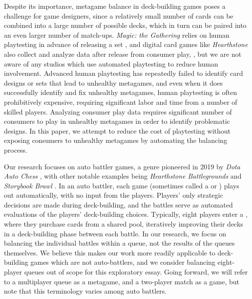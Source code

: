 
Despite its importance, metagame balance in deck-building games poses
a challenge for game designers, since a relatively small number of
cards can be combined into a large number of possible decks, which in
turn can be paired into an even larger number of
match-ups. \textit{Magic: the Gathering} relies on human playtesting
in advance of releasing a set \cite{designing-hod-ffl}, and digital
card games like \textit{Hearthstone} also collect and analyze data
after release from consumer play,
\cite{blizzard-gamebalancetalk-keg2019}, but we are not aware of any
studios which use automated playtesting to reduce human involvement.
Advanced human playtesting has repeatedly failed to identify card
designs or sets that lead to unhealthy metagames, and even when it
does successfully identify and fix unhealthy metagames, human
playtesting is often prohibitively expensive, requiring significant
labor and time from a number of skilled players. Analyzing consumer
play data requires significant number of consumers to play in
unhealthy metagames in order to identify problematic designs.
In this paper, we attempt to reduce the cost of playtesting without
exposing consumers to unhealthy metagames by automating the balancing
process.

Our research focuses on auto battler games, a genre pioneered in 2019
by \textit{Dota Auto Chess} \cite{autochess}, with other notable
examples being \textit{Hearthstone Battlegrounds}
\cite{hearthstone-battlegrounds} and \textit{Storybook Brawl}
\cite{storybook-brawl}.
In an auto battler, each game (sometimes called a  or
) plays out automatically, with no input from the
players. Players' only strategic decisions are made during
deck-building, and the battles serve as automated evaluations of the
players' deck-building choices. Typically, eight players enter a
, where they purchase cards from a shared pool,
iteratively improving their decks in a deck-building phase between
each battle. In our research, we focus on balancing the individual
battles within a queue, not the results of the queues themselves. We
believe this makes our work more readily applicable to deck-building
games which are not auto-battlers, and we consider balancing
eight-player queues out of scope for this exploratory essay.  Going
forward, we will refer to a multiplayer queue as a metagame, and a
two-player match as a game, but note that this terminology varies
among auto battlers.

